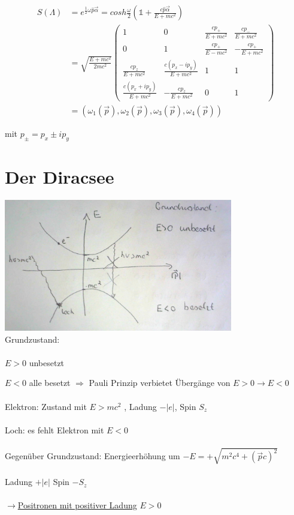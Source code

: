 \begin{align}
S(\Lambda) &= e^{\frac{1}{2}\omega\hat p \vec\alpha} = cosh\frac{\omega}{2}(\mathbb 1 + \frac{c\hat p\vec\alpha}{E+mc^2})\\
&=\sqrt{\frac{E+mc^2}{2mc^2}} \begin{pmatrix}1&0&\frac{cp_+}{E+mc^2}&\frac{cp_-}{E+mc^2}\\0&1&\frac{cp_+}{E-mc^2} &-\frac{cp_+}{E+mc^2}\\\frac{cp_z}{E+mc^2} &\frac{c(p_x-ip_y)}{E+mc^2}&1&1\\\frac{c(p_x+ip_y)}{E+mc^2} &-\frac{cp_z}{E+mc^2} &0&1\end{pmatrix} \\
&= (\omega_1(\vec p),\omega_2(\vec p), \omega_3(\vec p),\omega_4(\vec p))
\end{align}

mit \(p_\pm = p_x\pm ip_y\)


\section{Der Diracsee}



\includegraphics[width=0.75\textwidth]{kap06_02.png}
\\
Grundzustand:\\
\\
 \(E>0\) unbesetzt

\(E<0\) alle besetzt \(\Rightarrow \) Pauli Prinzip verbietet Übergänge von \(E>0 \rightarrow E<0 \)\\
\\
Elektron: Zustand mit \(E>mc^2\) , Ladung \(-|e|\), Spin \(S_z\)\\
\\
Loch: es fehlt Elektron mit \(E<0\)\\
\\
Gegenüber Grundzustand: Energieerhöhung um \(-E = +\sqrt{m^2c^4+(\vec pc)^2}\)\\
\\
Ladung \(+|e|\)
Spin \(-S_z\)\\
\\
\(\rightarrow \)\underline{Positronen mit positiver Ladung} \(E>0\)

